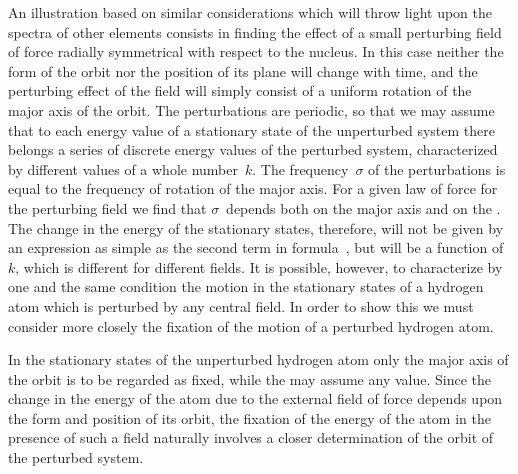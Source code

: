  An illustration based on similar considerations
which will throw light upon the spectra of other elements
consists in finding the effect of a small perturbing field of
force radially symmetrical with respect to the nucleus. In this case
neither the form of the orbit nor the position of its plane will
change with time, and the perturbing effect of the field will simply
consist of a uniform rotation of the major axis of the orbit. The
perturbations are periodic, so that we may assume that to each
energy value of a stationary state of the unperturbed system there
belongs a series of discrete energy values of the perturbed system,
characterized by different values of a whole number~$k$. The frequency~$\sigma$
of the perturbations is equal to the frequency of rotation
of the major axis. For a given law of force for the perturbing
field we find that $\sigma$~depends both on the major axis and on the
. The change in the energy of the stationary states,
therefore, will not be given by an expression as simple as the
second term in formula~, but will be a function of~$k$, which is
different for different fields. It is possible, however, to characterize
by one and the same condition the motion in the stationary states
of a hydrogen atom which is perturbed by any central field. In
order to show this we must consider more closely the fixation of
the motion of a perturbed hydrogen atom.

In the stationary states of the unperturbed hydrogen atom
only the major axis of the orbit is to be regarded as fixed,
while the  may assume any value. Since the change
in the energy of the atom due to the external field of force depends
upon the form and position of its orbit, the fixation of the
energy of the atom in the presence of such a field naturally
involves a closer determination of the orbit of the perturbed
system.

